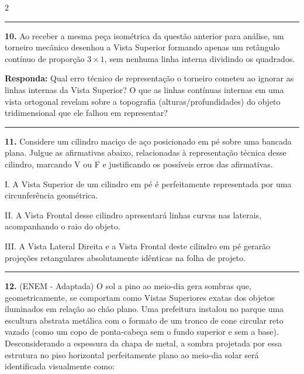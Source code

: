 \documentclass[twoside, 10pt, a4paper]{article}
\begin{document}
\begin{multicols*}{2}
\par\vspace{0.5cm}
\noindent\textcolor{CorLinha}{\rule{\linewidth}{0.5pt}}
\par\par\vspace{0.5cm}
\textbf{10.} Ao receber a mesma peça isométrica da questão anterior para análise, um torneiro mecânico desenhou a Vista Superior formando apenas um retângulo contínuo de proporção $3 \times 1$, sem nenhuma linha interna dividindo os quadrados. 
\begin{boxresponda}
\textbf{Responda:} Qual erro técnico de representação o torneiro cometeu ao ignorar as linhas internas da Vista Superior? O que as linhas contínuas internas em uma vista ortogonal revelam sobre a topografia (alturas/profundidades) do objeto tridimensional que ele falhou em representar?
\end{boxresponda}

\par\vspace{0.5cm}
\noindent\textcolor{CorLinha}{\rule{\linewidth}{0.5pt}} 
\par\par\vspace{0.5cm}
\textbf{11.} Considere um cilindro maciço de aço posicionado em pé sobre uma bancada plana. 
Julgue as afirmativas abaixo, relacionadas à representação técnica desse cilindro, marcando V ou F e justificando os possíveis erros das afirmativas.

I. A Vista Superior de um cilindro em pé é perfeitamente representada por uma circunferência geométrica.\par\par\vspace{0.5cm}
II. A Vista Frontal desse cilindro apresentará linhas curvas nas laterais, acompanhando o raio do objeto.\par\par\vspace{0.5cm}
III. A Vista Lateral Direita e a Vista Frontal deste cilindro em pé gerarão projeções retangulares absolutamente idênticas na folha de projeto.

\par\vspace{0.5cm}
\noindent\textcolor{CorLinha}{\rule{\linewidth}{0.5pt}} 
\par\par\vspace{0.5cm}
\textbf{12.} (ENEM - Adaptada) O sol a pino ao meio-dia gera sombras que, geometricamente, se comportam como Vistas Superiores exatas dos objetos iluminados em relação ao chão plano. Uma prefeitura instalou no parque uma escultura abstrata metálica com o formato de um tronco de cone circular reto vazado (como um copo de ponta-cabeça sem o fundo superior e sem a base). 
Desconsiderando a espessura da chapa de metal, a sombra projetada por essa estrutura no piso horizontal perfeitamente plano ao meio-dia solar será identificada visualmente como:


\end{multicols*}
\end{document}
